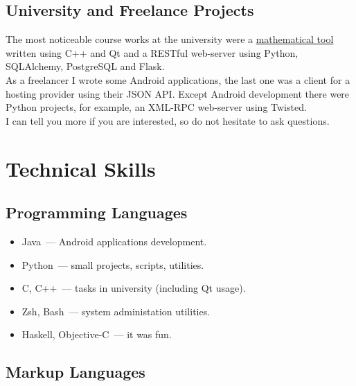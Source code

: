     \subsection*{University and Freelance Projects}

      The most noticeable course works at the university were
      a \href{https://github.com/ming13/aequatio}{mathematical tool} written
      using C++ and Qt and a RESTful web-server using Python,
      SQLAlchemy, PostgreSQL and Flask. \\

      As a freelancer I wrote some Android applications, the last one was
      a client for a hosting provider using their JSON API. Except Android
      development there were Python projects, for example, an XML-RPC
      web-server using Twisted. \\

      I can tell you more if you are interested, so do not hesitate to ask
      questions.

  \section*{Technical Skills}

    \subsection*{Programming Languages}

      \begin{itemize}

        \item Java~--- Android applications development.

        \item Python~--- small projects, scripts, utilities.

        \item C, C++~--- tasks in university (including Qt usage).

        \item Zsh, Bash~--- system administation utilities.

        \item Haskell, Objective-C~--- it was fun.

      \end{itemize}

    \subsection*{Markup Languages}


